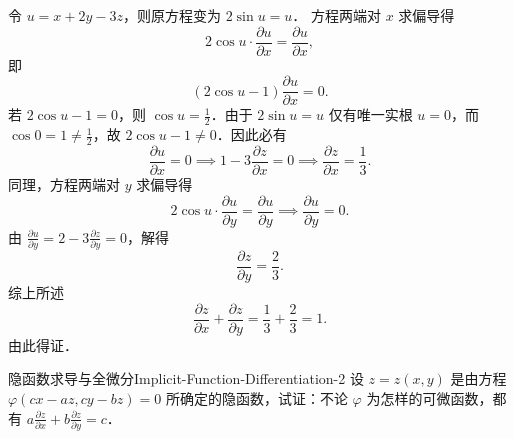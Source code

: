 \begin{myproof}
    令 $u = x + 2y - 3z$，则原方程变为 $2\sin u = u$．
    方程两端对 $x$ 求偏导得
    \begin{equation}
        2\cos u \cdot \frac{\partial u}{\partial x} = \frac{\partial u}{\partial x},
    \end{equation}
    即
    \begin{equation}
        (2\cos u - 1) \frac{\partial u}{\partial x} = 0.
    \end{equation}
    若 $2\cos u - 1 = 0$，则 $\cos u = \frac{1}{2}$．由于 $2\sin u = u$ 仅有唯一实根 $u = 0$，而 $\cos 0 = 1 \neq \frac{1}{2}$，故 $2\cos u - 1 \neq 0$．因此必有
    \begin{equation}
        \frac{\partial u}{\partial x} = 0 \implies 1 - 3 \frac{\partial z}{\partial x} = 0 \implies \frac{\partial z}{\partial x} = \frac{1}{3}.
    \end{equation}
    同理，方程两端对 $y$ 求偏导得
    \begin{equation}
        2\cos u \cdot \frac{\partial u}{\partial y} = \frac{\partial u}{\partial y} \implies \frac{\partial u}{\partial y} = 0.
    \end{equation}
    由 $\frac{\partial u}{\partial y} = 2 - 3 \frac{\partial z}{\partial y} = 0$，解得
    \begin{equation}
        \frac{\partial z}{\partial y} = \frac{2}{3}.
    \end{equation}
    综上所述
    \begin{equation}
        \frac{\partial z}{\partial x} + \frac{\partial z}{\partial y} = \frac{1}{3} + \frac{2}{3} = 1.
    \end{equation}
    由此得证．
\end{myproof}


\begin{problem}{隐函数求导与全微分}{Implicit-Function-Differentiation-2}
    设 $z = z(x, y)$ 是由方程 $\varphi(cx - az, cy - bz) = 0$ 所确定的隐函数，试证：不论 $\varphi$ 为怎样的可微函数，都有 $a\frac{\partial z}{\partial x} + b\frac{\partial z}{\partial y} = c$．
\end{problem}

